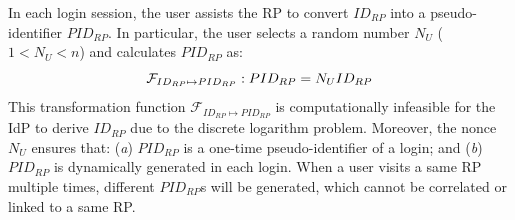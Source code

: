 \vspace{0.5mm}
 In each login session, the user assists the RP to convert $ID_{RP}$ into a pseudo-identifier $PID_{RP}$. In particular, the user selects a random number $N_{U}$ ($1 < N_{U}<n$) and calculates $PID_{RP}$ as:
\begin{equation}
\setlength{\abovedisplayskip}{3pt}
\setlength{\belowdisplayskip}{3pt}
\mathcal{F}_{ID_{RP} \mapsto PID_{RP}}: PID_{RP} = {N_{U}}{ID_{RP}}
\label{equ:PIDRP}
\end{equation}
This transformation function $\mathcal{F}_{ID_{RP} \mapsto PID_{RP}}$ %
is computationally infeasible for the IdP to derive $ID_{RP}$%
due to the discrete logarithm problem.
Moreover, the nonce $N_{U}$ ensures that: (\emph{a}) $PID_{RP}$ is a one-time pseudo-identifier of a login;  
and (\emph{b}) $PID_{RP}$ is dynamically generated in each login. 
When a user visits a same RP multiple times, different $PID_{RP}$s will be generated, which cannot be correlated or linked to a same RP.




